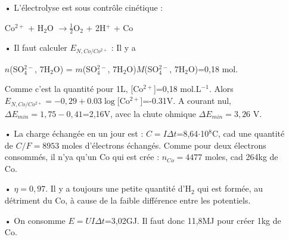 \documentclass{report}
\begin{document}
\begin{itemize}
	 \item[•] L'électrolyse est sous contrôle cinétique : 
	 
	 Co$^{2+}$ + H$_2$O $\longrightarrow\frac{1}{2}$O$_2$ + 2H$^+$ + Co
	 \item[•] Il faut calculer $E_{N,Co/Co^{2+}}$ :
	 Il y a 
	 
	 $n$(SO$_{4}^{2-}$, 7H$_2$O) = $m$(SO$_{4}^{2-}$, 7H$_2$O)$M$(SO$_{4}^{2-}$, 7H$_2$O)=0,18 mol.
	 
	 Comme c'est la quantité pour 1L, [Co$^{2+}$]=0,18 mol.L$^{-1}$. Alors $E_{N,Co/Co^{2+}}=-0,29+0.03\log$[Co$^{2+}$]=-0.31V.
	  A courant nul, $\Delta E_{min}=1,75-0,41$=2,16V, avec la chute ohmique $\Delta E_{min}=3,26$ V.
	  
	  \item[•] La charge échangée en un jour est : $C=I\Delta t$=8,64$\cdot$10$^8$C, cad une quantité de $C/F=8953$ moles d'électrons échangés. Comme pour deux électrons consommés, il n'ya qu'un Co qui est crée :
	  $n_{Co}=4477$ moles, cad 264kg de Co.
	  \item[•] $\eta=0,97$. Il y a toujours une petite quantité d'H$_2$ qui est formée, au détriment du Co, à cause de la faible différence entre les potentiels.
	  \item[•] On consomme $E= UI\Delta t$=3,02GJ. Il faut donc 11,8MJ pour créer 1kg de Co.
\end{itemize}
\end{document}
